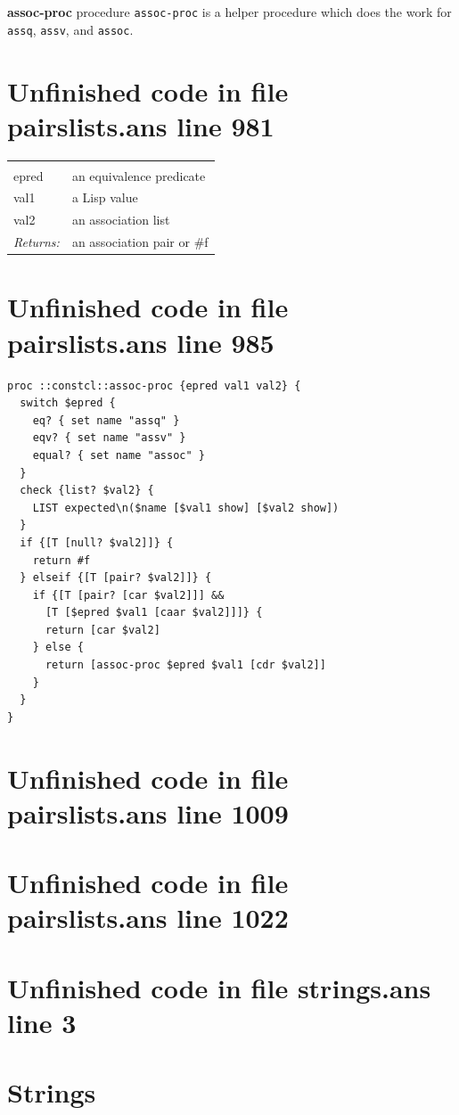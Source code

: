 \documentclass[twoside,9pt]{report}
\begin{document}
\textbf{assoc-proc} procedure \texttt{assoc-proc} is a helper procedure which does the work for \texttt{assq}, \texttt{assv}, and \texttt{assoc}.

\section{Unfinished code in file pairslists.ans line 981}
\noindent\begin{tabular}{ |p{1.9cm} p{8cm}| }
\hline
\rowcolor[HTML]{CCCCCC} \multicolumn{2}{|l|}{\bf assoc-proc (internal)} \\
epred & an equivalence predicate \\
val1 & a Lisp value \\
val2 & an association list \\
\textit{Returns:} & an association pair or \#f \\
\hline
\end{tabular}
\section{Unfinished code in file pairslists.ans line 985}
\begin{lstlisting}
proc ::constcl::assoc-proc {epred val1 val2} {
  switch $epred {
    eq? { set name "assq" }
    eqv? { set name "assv" }
    equal? { set name "assoc" }
  }
  check {list? $val2} {
    LIST expected\n($name [$val1 show] [$val2 show])
  }
  if {[T [null? $val2]]} {
    return #f
  } elseif {[T [pair? $val2]]} {
    if {[T [pair? [car $val2]]] && 
      [T [$epred $val1 [caar $val2]]]} {
      return [car $val2]
    } else {
      return [assoc-proc $epred $val1 [cdr $val2]]
    }
  }
}
\end{lstlisting}
\section{Unfinished code in file pairslists.ans line 1009}
\section{Unfinished code in file pairslists.ans line 1022}
\section{Unfinished code in file strings.ans line 3}
\section{Strings}
\label{strings}
\end{document}
